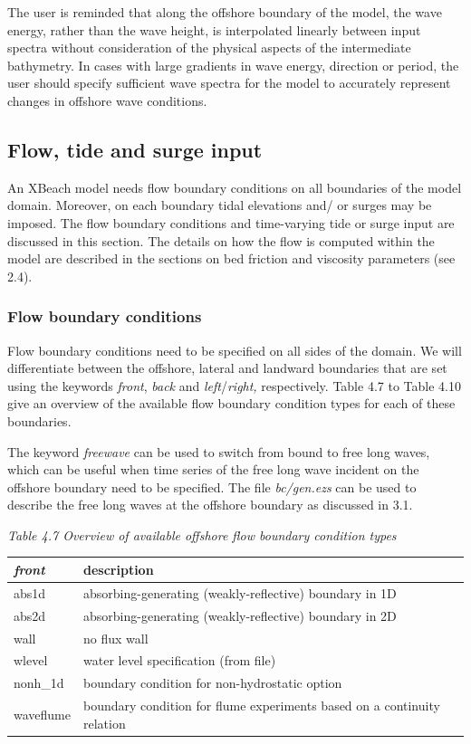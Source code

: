 \documentclass{article}
\begin{document}
\noindent The user is reminded that along the offshore boundary of the model, the wave energy, rather than the wave height, is interpolated linearly between input spectra without consideration of the physical aspects of the intermediate bathymetry. In cases with large gradients in wave energy, direction or period, the user should specify sufficient wave spectra for the model to accurately represent changes in offshore wave conditions.


\subsection{ Flow, tide and surge input}

\noindent An XBeach model needs flow boundary conditions on all boundaries of the model domain. Moreover, on each boundary  tidal elevations and/ or surges may be imposed. The flow boundary conditions and time-varying tide or surge input are discussed in this section. The details on how the flow is computed within the model are described in the sections on bed friction and viscosity parameters (see 2.4).


\subsubsection{ Flow boundary conditions}

\noindent Flow boundary conditions need to be specified on all sides of the domain. We will differentiate between the offshore, lateral and landward boundaries that are set using the keywords \textit{front}, \textit{back} and \textit{left}/\textit{right,} respectively. Table 4.7 to Table 4.10 give an overview of the available flow boundary condition types for each of these boundaries.

\noindent The keyword \textit{freewave} can be used to switch from bound to free long waves, which can be useful when time series of the free long wave incident on the offshore boundary need to be specified. The file \textit{bc/gen.ezs} can be used to describe the free long waves at the offshore boundary as discussed in 3.1.

\noindent \textit{Table 4.7 Overview of available offshore flow boundary condition types}

\begin{tabular}{|p{0.9in}|p{3.2in}|} \hline 
\textit{front} & description \\ \hline 
abs1d & absorbing-generating (weakly-reflective) boundary in 1D \\ \hline 
abs2d & absorbing-generating (weakly-reflective) boundary in 2D \\ \hline 
wall & no flux wall \\ \hline 
wlevel & water level specification (from file) \\ \hline 
nonh\_1d & boundary condition for non-hydrostatic option \\ \hline 
waveflume & boundary condition for flume experiments based on a continuity relation  \\ \hline 
\end{tabular}
\end{document}
